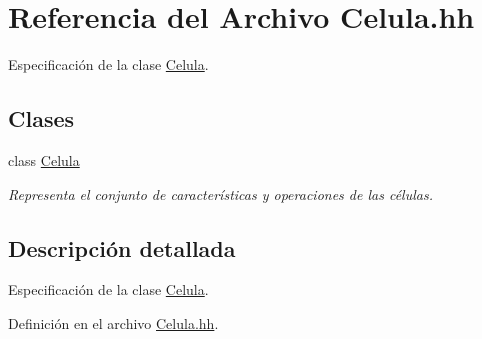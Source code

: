 \hypertarget{_celula_8hh}{\section{Referencia del Archivo Celula.\+hh}
\label{_celula_8hh}
}


Especificación de la clase \hyperlink{class_celula}{Celula}.  


\subsection*{Clases}
\begin{DoxyCompactItemize}
\item 
class \hyperlink{class_celula}{Celula}
\begin{DoxyCompactList}\small\item\em Representa el conjunto de características y operaciones de las células. \end{DoxyCompactList}\end{DoxyCompactItemize}


\subsection{Descripción detallada}
Especificación de la clase \hyperlink{class_celula}{Celula}. 



Definición en el archivo \hyperlink{_celula_8hh_source}{Celula.\+hh}.


